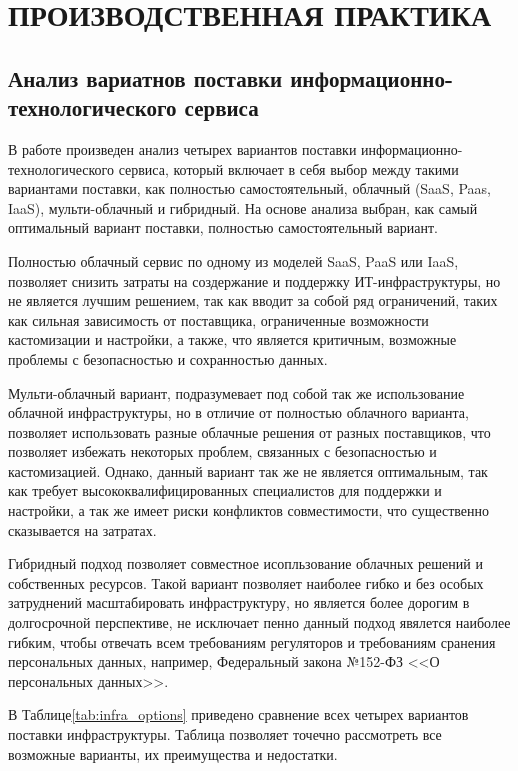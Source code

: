 \documentclass[14pt, a4paper]{extarticle}
\begin{document}
\section{ПРОИЗВОДСТВЕННАЯ ПРАКТИКА}

\subsection{Анализ вариатнов поставки информационно-технологического сервиса}

В работе произведен анализ четырех вариантов поставки
информационно-технологического сервиса, который включает в себя выбор между
такими вариантами поставки, как полностью самостоятельный, облачный (SaaS, Paas, IaaS),
мульти-облачный и гибридный. На основе анализа выбран, как самый оптимальный вариант
поставки, полностью самостоятельный вариант.

Полностью облачный сервис \cite{micrasoft-azure-book} по одному из моделей SaaS,
PaaS или IaaS, позволяет снизить затраты на создержание и поддержку ИТ-инфраструктуры,
но не является лучшим решением, так как вводит за собой ряд ограничений, таких как
сильная зависимость от поставщика, ограниченные возможности кастомизации и настройки,
а также, что является критичным, возможные проблемы с безопасностью и сохранностью данных.

Мульти-облачный вариант, подразумевает под собой так же использование облачной
инфраструктуры, но в отличие от полностью облачного варианта, позволяет использовать
разные облачные решения от разных поставщиков, что позволяет избежать
некоторых проблем, связанных с безопасностью и кастомизацией. Однако, данный
вариант так же не является оптимальным, так как требует высококвалифицированных
специалистов для поддержки и настройки, а так же имеет риски конфликтов совместимости,
что существенно сказывается на затратах.

Гибридный подход позволяет совместное исопльзование облачных решений и собственных
ресурсов. Такой вариант позволяет наиболее гибко и без особых затруднений масштабировать
инфраструктуру, но является более дорогим в долгосрочной перспективе, не исключает
пенно данный подход явялется наиболее гибким, чтобы отвечать всем требованиям
регуляторов и требованиям сранения персональных данных, например, Федеральный закона
№152-ФЗ <<О персональных данных>>.

В Таблице\;\ref{tab:infra_options} приведено сравнение всех четырех вариантов поставки
инфраструктуры. Таблица позволяет точечно рассмотреть все возможные варианты, их
преимущества и недостатки.
\end{document}

